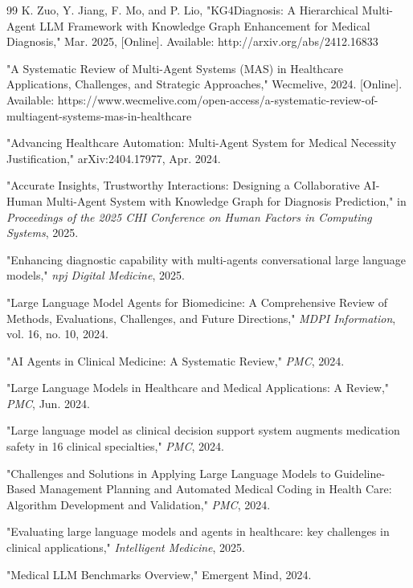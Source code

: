 \documentclass[conference]{IEEEtran}
\begin{document}
\begin{thebibliography}{99}
K. Zuo, Y. Jiang, F. Mo, and P. Lio, "KG4Diagnosis: A Hierarchical Multi-Agent LLM Framework with Knowledge Graph Enhancement for Medical Diagnosis," Mar. 2025, [Online]. Available: http://arxiv.org/abs/2412.16833

"A Systematic Review of Multi-Agent Systems (MAS) in Healthcare Applications, Challenges, and Strategic Approaches," Wecmelive, 2024. [Online]. Available: https://www.wecmelive.com/open-access/a-systematic-review-of-multiagent-systems-mas-in-healthcare

"Advancing Healthcare Automation: Multi-Agent System for Medical Necessity Justification," arXiv:2404.17977, Apr. 2024.

"Accurate Insights, Trustworthy Interactions: Designing a Collaborative AI-Human Multi-Agent System with Knowledge Graph for Diagnosis Prediction," in \textit{Proceedings of the 2025 CHI Conference on Human Factors in Computing Systems}, 2025.

"Enhancing diagnostic capability with multi-agents conversational large language models," \textit{npj Digital Medicine}, 2025.

"Large Language Model Agents for Biomedicine: A Comprehensive Review of Methods, Evaluations, Challenges, and Future Directions," \textit{MDPI Information}, vol. 16, no. 10, 2024.

"AI Agents in Clinical Medicine: A Systematic Review," \textit{PMC}, 2024.

"Large Language Models in Healthcare and Medical Applications: A Review," \textit{PMC}, Jun. 2024.

"Large language model as clinical decision support system augments medication safety in 16 clinical specialties," \textit{PMC}, 2024.

"Challenges and Solutions in Applying Large Language Models to Guideline-Based Management Planning and Automated Medical Coding in Health Care: Algorithm Development and Validation," \textit{PMC}, 2024.

"Evaluating large language models and agents in healthcare: key challenges in clinical applications," \textit{Intelligent Medicine}, 2025.

"Medical LLM Benchmarks Overview," Emergent Mind, 2024.


\end{thebibliography}
\end{document}
